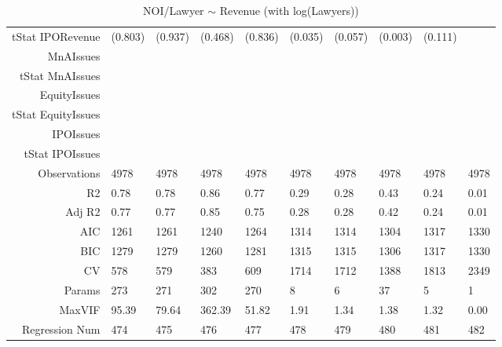 \begin{table}[ht]
\begin{tabular}{rlllllllll}
  tStat IPORevenue & (0.803) & (0.937) & (0.468) & (0.836) & (0.035) & (0.057) & (0.003) & (0.111) &  \\ 
  MnAIssues &  &  &  &  &  &  &  &  &  \\ 
  tStat MnAIssues &  &  &  &  &  &  &  &  &  \\ 
  EquityIssues &  &  &  &  &  &  &  &  &  \\ 
  tStat EquityIssues &  &  &  &  &  &  &  &  &  \\ 
  IPOIssues &  &  &  &  &  &  &  &  &  \\ 
  tStat IPOIssues &  &  &  &  &  &  &  &  &  \\ 
  Observations & 4978 & 4978 & 4978 & 4978 & 4978 & 4978 & 4978 & 4978 & 4978 \\ 
  R2 & 0.78 & 0.78 & 0.86 & 0.77 & 0.29 & 0.28 & 0.43 & 0.24 & 0.01 \\ 
  Adj R2 & 0.77 & 0.77 & 0.85 & 0.75 & 0.28 & 0.28 & 0.42 & 0.24 & 0.01 \\ 
  AIC & 1261 & 1261 & 1240 & 1264 & 1314 & 1314 & 1304 & 1317 & 1330 \\ 
  BIC & 1279 & 1279 & 1260 & 1281 & 1315 & 1315 & 1306 & 1317 & 1330 \\ 
  CV & 578 & 579 & 383 & 609 & 1714 & 1712 & 1388 & 1813 & 2349 \\ 
  Params & 273 & 271 & 302 & 270 & 8 & 6 & 37 & 5 & 1 \\ 
  MaxVIF & 95.39 & 79.64 & 362.39 & 51.82 & 1.91 & 1.34 & 1.38 & 1.32 & 0.00 \\ 
  Regression Num & 474 & 475 & 476 & 477 & 478 & 479 & 480 & 481 & 482 \\ 
   \hline
\end{tabular}
\caption{NOI/Lawyer $\sim$ Revenue (with log(Lawyers))} 
\end{table}
